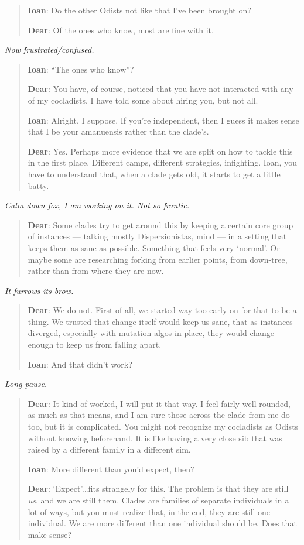 \begin{quote}
\textbf{Ioan}: Do the other Odists not like that I've been brought on?

\textbf{Dear}: Of the ones who know, most are fine with it.
\end{quote}

\emph{Now frustrated/confused.}

\begin{quote}
\textbf{Ioan}: ``The ones who know''?

\textbf{Dear}: You have, of course, noticed that you have not interacted with any of my cocladists. I have told some about hiring you, but not all.

\textbf{Ioan}: Alright, I suppose. If you're independent, then I guess it makes sense that I be your amanuensis rather than the clade's.

\textbf{Dear}: Yes. Perhaps more evidence that we are split on how to tackle this in the first place. Different camps, different strategies, infighting. Ioan, you have to understand that, when a clade gets old, it starts to get a little batty.
\end{quote}

\emph{Calm down fox, I am working on it. Not so frantic.}

\begin{quote}
\textbf{Dear}: Some clades try to get around this by keeping a certain core group of instances — talking mostly Dispersionistas, mind — in a setting that keeps them as sane as possible. Something that feels very `normal'. Or maybe some are researching forking from earlier points, from down-tree, rather than from where they are now.
\end{quote}

\emph{It furrows its brow.}

\begin{quote}
\textbf{Dear}: We do not. First of all, we started way too early on for that to be a thing. We trusted that change itself would keep us sane, that as instances diverged, especially with mutation algos in place, they would change enough to keep us from falling apart.

\textbf{Ioan}: And that didn't work?
\end{quote}

\emph{Long pause.}

\begin{quote}
\textbf{Dear}: It kind of worked, I will put it that way. I feel fairly well rounded, as much as that means, and I am sure those across the clade from me do too, but it is complicated. You might not recognize my cocladists as Odists without knowing beforehand. It is like having a very close sib that was raised by a different family in a different sim.

\textbf{Ioan}: More different than you'd expect, then?

\textbf{Dear}: `Expect'\ldots{}fits strangely for this. The problem is that they are still \emph{us}, and we are still them. Clades are families of separate individuals in a lot of ways, but you must realize that, in the end, they are still one individual. We are more different than one individual should be. Does that make sense?
\end{quote}

